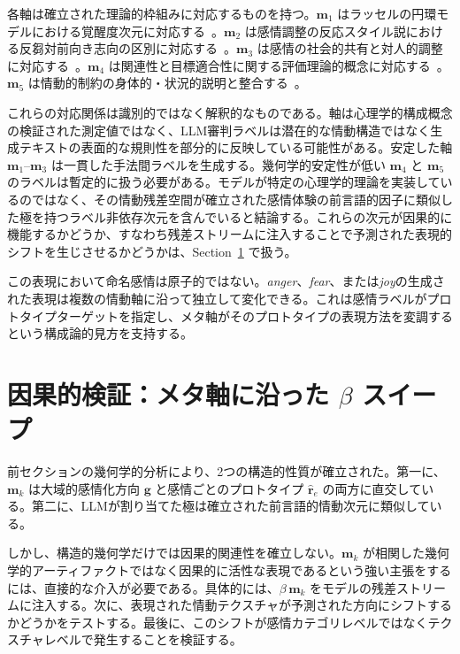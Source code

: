 各軸は確立された理論的枠組みに対応するものを持つ。$\mathbf{m}_1$ はラッセルの円環モデルにおける覚醒度次元に対応する~\cite{russell1980circumplex}。$\mathbf{m}_2$ は感情調整の反応スタイル説における反芻対前向き志向の区別に対応する~\cite{nolenhoeksema1991responses}。$\mathbf{m}_3$ は感情の社会的共有と対人的調整に対応する~\cite{rime2009socialsharing}。$\mathbf{m}_4$ は関連性と目標適合性に関する評価理論的概念に対応する~\cite{scherer2001appraisal}。$\mathbf{m}_5$ は情動的制約の身体的・状況的説明と整合する~\cite{damasio1996somatic}。\par

これらの対応関係は識別的ではなく解釈的なものである。軸は心理学的構成概念の検証された測定値ではなく、LLM審判ラベルは潜在的な情動構造ではなく生成テキストの表面的な規則性を部分的に反映している可能性がある。安定した軸 $\mathbf{m}_1$--$\mathbf{m}_3$ は一貫した手法間ラベルを生成する。幾何学的安定性が低い $\mathbf{m}_4$ と $\mathbf{m}_5$ のラベルは暫定的に扱う必要がある。モデルが特定の心理学的理論を実装しているのではなく、その情動残差空間が確立された感情体験の前言語的因子に類似した極を持つラベル非依存次元を含んでいると結論する。これらの次元が因果的に機能するかどうか、すなわち残差ストリームに注入することで予測された表現的シフトを生じさせるかどうかは、Section~\ref{sec:ch2-causal-validation} で扱う。\par

この表現において命名感情は原子的ではない。\textit{anger}、\textit{fear}、または\textit{joy}の生成された表現は複数の情動軸に沿って独立して変化できる。これは感情ラベルがプロトタイプターゲットを指定し、メタ軸がそのプロトタイプの表現方法を変調するという構成論的見方を支持する。\par

\section{因果的検証：メタ軸に沿った $\beta$ スイープ}
\label{sec:ch2-causal-validation}

前セクションの幾何学的分析により、2つの構造的性質が確立された。第一に、$\mathbf{m}_k$ は大域的感情化方向 $\mathbf{g}$ と感情ごとのプロトタイプ $\hat{\mathbf{r}}_e$ の両方に直交している。第二に、LLMが割り当てた極は確立された前言語的情動次元に類似している。\par

しかし、構造的幾何学だけでは因果的関連性を確立しない。$\mathbf{m}_k$ が相関した幾何学的アーティファクトではなく因果的に活性な表現であるという強い主張をするには、直接的な介入が必要である。具体的には、$\beta\,\mathbf{m}_k$ をモデルの残差ストリームに注入する。次に、表現された情動テクスチャが予測された方向にシフトするかどうかをテストする。最後に、このシフトが感情カテゴリレベルではなくテクスチャレベルで発生することを検証する。\par


